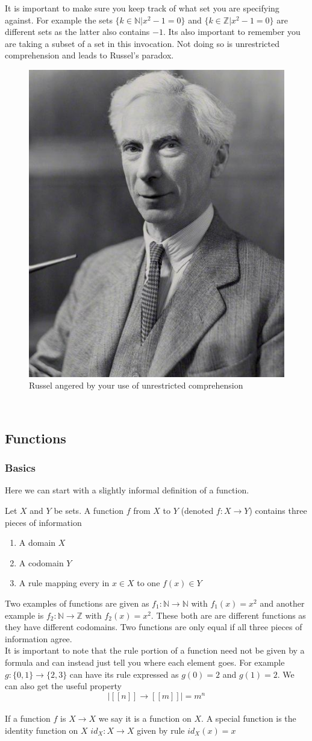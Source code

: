 \documentclass{article}
\begin{document}
It is important to make sure you keep track of what set you are specifying against. For example the sets $\{k \in \mathbb{N} | x^2 - 1 = 0\}$ and $\{k \in \mathbb{Z} | x^2 - 1 = 0\}$ are different sets as the latter also contains $-1$. Its also important to remember you are taking a subset of a set in this invocation. Not doing so is unrestricted comprehension and leads to Russel's paradox.
\begin{figure}[h]
    \centering
    \includegraphics[width=0.3\linewidth]{russel.jpg}
    \caption{Russel angered by your use of unrestricted comprehension}
    \label{fig:placeholder}
\end{figure}
\\
\subsection{Functions}
\subsubsection{Basics}
Here we can start with a slightly informal definition of a function. 
\begin{definition}
    Let $X$ and $Y$ be sets. A function $f$ from $X$ to $Y$ (denoted $f:X \to Y$) contains three pieces of information
    \begin{enumerate}
        \item A domain $X$
        \item A codomain $Y$
        \item A rule mapping every in $x \in X$ to one $f(x) \in Y$
    \end{enumerate}
\end{definition}
Two examples of functions are given as $f_1:\mathbb{N} \to \mathbb{N}$ with $f_1(x) = x^2$ and another example is $f_2:\mathbb{N} \to \mathbb{Z}$ with $f_2(x) = x^2$. These both are are different functions as they have different codomains. Two functions are only equal if all three pieces of information agree.
\\
It is important to note that the rule portion of a function need not be given by a formula and can instead just tell you where each element goes. For example
$g : \{0,1\} \to \{2,3\}$ can have its rule expressed as $g(0) = 2$ and $g(1) = 2$. We can also get the useful property
\[|[[n]] \to [[m]]| = m^n\]
\\
If a function $f$ is $X \to X$ we say it is a function on $X$. A special function is the identity function on $X$ $id_{X}:X \to X$ given by rule $id_X(x) = x$
\end{document}
